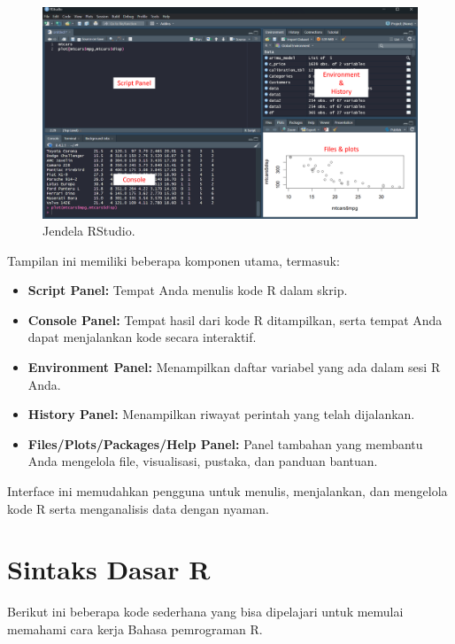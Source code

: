 \documentclass[
]{book}
\providecommand{\tightlist}{%
  \setlength{\itemsep}{0pt}\setlength{\parskip}{0pt}}
\begin{document}
\begin{figure}

{\centering \includegraphics[width=1\linewidth]{./images/Bab1/Rstudio} 

}

\caption{Jendela RStudio.}\label{fig:jendela-RStudio}
\end{figure}

Tampilan ini memiliki beberapa komponen utama, termasuk:

\begin{itemize}
\tightlist
\item
  \textbf{Script Panel:} Tempat Anda menulis kode R dalam skrip.
\item
  \textbf{Console Panel:} Tempat hasil dari kode R ditampilkan, serta tempat Anda dapat menjalankan kode secara interaktif.
\item
  \textbf{Environment Panel:} Menampilkan daftar variabel yang ada dalam sesi R Anda.
\item
  \textbf{History Panel:} Menampilkan riwayat perintah yang telah dijalankan.
\item
  \textbf{Files/Plots/Packages/Help Panel:} Panel tambahan yang membantu Anda mengelola file, visualisasi, pustaka, dan panduan bantuan.
\end{itemize}

Interface ini memudahkan pengguna untuk menulis, menjalankan, dan mengelola kode R serta menganalisis data dengan nyaman.

\hypertarget{sintaks-dasar-r}{%
\section{Sintaks Dasar R}\label{sintaks-dasar-r}}

Berikut ini beberapa kode sederhana yang bisa dipelajari untuk memulai memahami cara kerja Bahasa pemrograman R.
\end{document}
